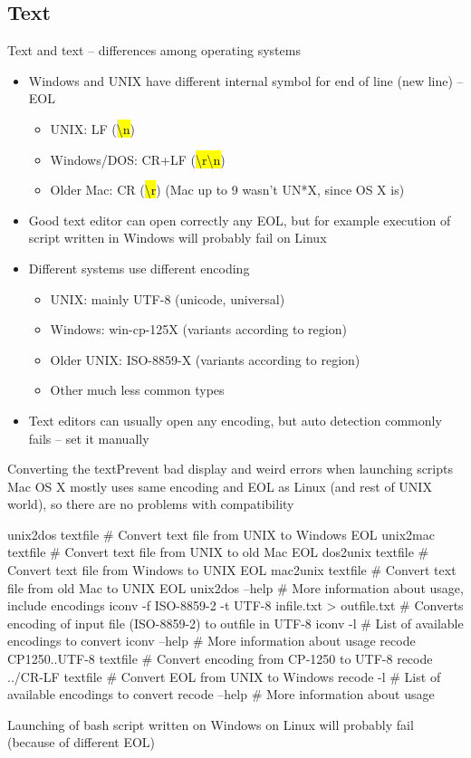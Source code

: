 \documentclass[compress, ucs, xelatex, 11pt, xcolor=svgnames,
  hyperref={
    bookmarks=true,
    unicode=true,
    colorlinks=true,
    pdftitle={Linux, command line and MetaCentrum},
    plainpages=false,
    pdfauthor={Vojtech Zeisek},
    pdfsubject={Course about use of Linux command line, writing shell scripts and using MetaCentrum of CESNET},
    pdfcreator={XeLaTeX},
    pdfkeywords={Linux, GNU, BASH, shell, command line, MetaCentrum},
    linkcolor=Red,
    anchorcolor=Blue,
    citecolor=Purple,
    filecolor=DodgerBlue,
    menucolor=DarkOrchid,
    urlcolor=DeepSkyBlue,
    pdftex},
  url={hyphens, lowtilde} %
  ]{beamer}
\renewcommand{\texttt}[1]{\hl{\ttfamily #1}}
\begin{document}
\subsection{Text}

\begin{frame}{Text and text -- differences among operating systems}
\begin{itemize}
  \item Windows and UNIX have different internal symbol for end of line (new line) -- EOL
  \begin{itemize}
    \item UNIX: LF (\texttt{\textbackslash n})
    \item Windows/DOS: CR+LF (\texttt{\textbackslash r\textbackslash n})
    \item Older Mac: CR (\texttt{\textbackslash r}) (Mac up to 9 wasn't UN*X, since OS X is)
  \end{itemize}
  \item Good text editor can open correctly any EOL, but for example execution of script written in Windows will probably fail on Linux
  \item Different systems use different encoding
  \begin{itemize}
    \item UNIX: mainly UTF-8 (unicode, universal)
    \item Windows: win-cp-125X (variants according to region)
    \item Older UNIX: ISO-8859-X (variants according to region)
    \item Other much less common types
  \end{itemize}
  \item Text editors can usually open any encoding, but auto detection commonly fails -- set it manually
\end{itemize}
\end{frame}

\begin{frame}[fragile]{Converting the text}{Prevent bad display and weird errors when launching scripts}
  Mac OS X mostly uses same encoding and EOL as Linux (and rest of UNIX world), so there are no problems with compatibility
  \begin{bashcode}
    unix2dos textfile # Convert text file from UNIX to Windows EOL
    unix2mac textfile # Convert text file from UNIX to old Mac EOL
    dos2unix textfile # Convert text file from Windows to UNIX EOL
    mac2unix textfile # Convert text file from old Mac to UNIX EOL
    unix2dos --help # More information about usage, include encodings
    iconv -f ISO-8859-2 -t UTF-8 infile.txt > outfile.txt
      # Converts encoding of input file (ISO-8859-2) to outfile in UTF-8
    iconv -l # List of available encodings to convert
    iconv --help # More information about usage
    recode CP1250..UTF-8 textfile # Convert encoding from CP-1250 to UTF-8
    recode ../CR-LF textfile # Convert EOL from UNIX to Windows
    recode -l # List of available encodings to convert
    recode --help # More information about usage
  \end{bashcode}
  Launching of bash script written on Windows on Linux will probably fail (because of different EOL)
\end{frame}
\end{document}
